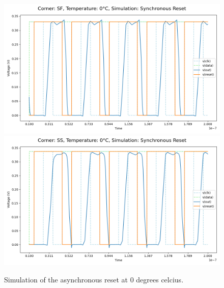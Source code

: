 \begin{figure}[H]
    \vspace{5pt}
    \includegraphics[height= 0.21\textheight]{figures/aimspice/SF/0/W3.csv.png}
    \vspace{5pt}
    \includegraphics[height= 0.21\textheight]{figures/aimspice/SS/0/W3.csv.png}
    \caption{Simulation of the asynchronous reset at 0 degrees celcius.}
    \label{fig:aimspice_W3_0}
\end{figure}

\pagebreak

